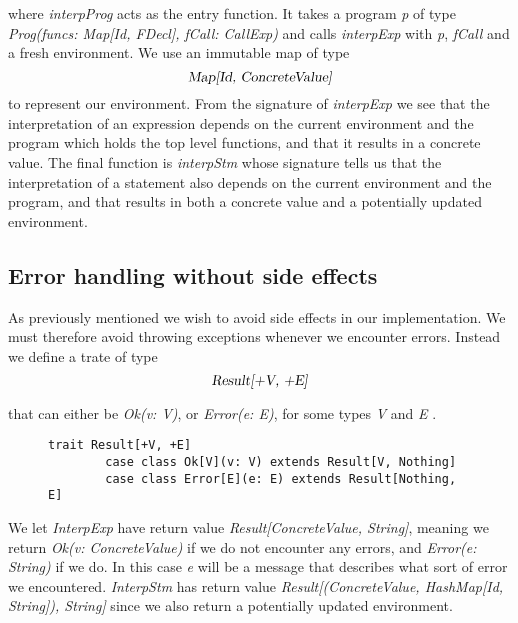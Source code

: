  \noindent where \textsl{interpProg} acts as the entry function. It takes a program \textsl{p} of type \textsl{Prog(funcs: Map[Id, FDecl], fCall: CallExp)} and calls \textsl{interpExp} with \textsl{p}, \textsl{fCall} and a fresh environment. We use an immutable map of type 
 \begin{equation*}
 	\textsl{Map[Id, ConcreteValue]}
 \end{equation*}
 to represent our environment. From the signature of \textsl{interpExp} we see that the interpretation of an expression depends on the current environment and the program which holds the top level functions, and that it results in a concrete value. The final function is \textsl{interpStm} whose signature tells us that the interpretation of a statement also depends on the current environment and the program, and that results in both a concrete value and a potentially updated environment. 

\subsection{Error handling without side effects}
 As previously mentioned we wish to avoid side effects in our implementation. We must therefore avoid throwing exceptions whenever we encounter errors.
 Instead we define a trate of type 
 \begin{equation*}
 	\textsl{Result[+V, +E]}
 \end{equation*}
 
  that can either be \textsl{Ok(v: V)},  or \textsl{Error(e: E)}, for some types \textsl{V} and \textsl{E} \citep{Chiusano:2014:FPS:2688794}.

\begin{figure}[!h]
	\begin{lstlisting}[style=simple]
		trait Result[+V, +E]
		case class Ok[V](v: V) extends Result[V, Nothing]
		case class Error[E](e: E) extends Result[Nothing, E]
	\end{lstlisting}
\end{figure}

We let \textsl{InterpExp} have return value \textsl{Result[ConcreteValue, String]}, meaning we return \textsl{Ok(v: ConcreteValue)} if we do not encounter any errors, and \textsl{Error(e: String)} if we do. In this case \textsl{e} will be a message that describes what sort of error we encountered. \textsl{InterpStm} has return value 
 \textsl{Result[(ConcreteValue, HashMap[Id, String]), String]} since we also return a potentially updated environment. 

